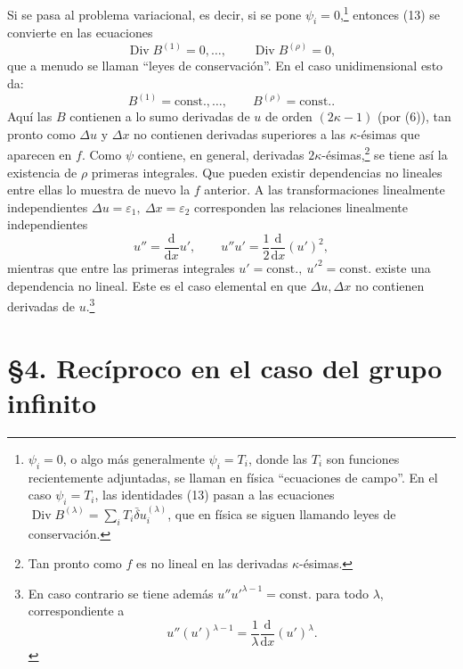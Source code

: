 \documentclass[11pt]{article}
\newcommand{\D}{\Delta}
\newcommand{\eps}{\varepsilon}
\providecommand{\dd}{\mathrm d}
\providecommand{\Div}{\operatorname{Div}}
\providecommand{\bd}{\bar{\delta}}
\begin{document}
Si se pasa al problema variacional, es decir, si se pone \(\psi_i=0\),\footnote{\(\psi_i=0\), o algo más generalmente \(\psi_i=T_i\), donde las \(T_i\) son funciones recientemente adjuntadas, se llaman en física ``ecuaciones de campo''. En el caso \(\psi_i=T_i\), las identidades (13) pasan a las ecuaciones \(\Div B^{(\lambda)}=\sum_i T_i\bd u_i^{(\lambda)}\), que en física se siguen llamando leyes de conservación.} entonces (13) se convierte en las ecuaciones
\[
\Div B^{(1)}=0,\ldots,\qquad \Div B^{(\rho)}=0,
\]
que a menudo se llaman ``leyes de conservación''. En el caso unidimensional esto da:
\[
B^{(1)}=\mathrm{const.},\ldots,\qquad B^{(\rho)}=\mathrm{const.}.
\]
Aquí las \(B\) contienen a lo sumo derivadas de \(u\) de orden \((2\kappa-1)\) (por (6)), tan pronto como \(\D u\) y \(\D x\) no contienen derivadas superiores a las \(\kappa\)-ésimas que aparecen en \(f\). Como \(\psi\) contiene, en general, derivadas \(2\kappa\)-ésimas,\footnote{Tan pronto como \(f\) es no lineal en las derivadas \(\kappa\)-ésimas.} se tiene así la existencia de \(\rho\) primeras integrales. Que pueden existir dependencias no lineales entre ellas lo muestra de nuevo la \(f\) anterior. A las transformaciones linealmente independientes \(\D u=\eps_1,\ \D x=\eps_2\) corresponden las relaciones linealmente independientes
\[
u''=\frac{\dd}{\dd x}u',\qquad
u''u'=\frac12\frac{\dd}{\dd x}(u')^2,
\]
mientras que entre las primeras integrales \(u'=\mathrm{const.},\ u'^2=\mathrm{const.}\) existe una dependencia no lineal. Este es el caso elemental en que \(\D u,\D x\) no contienen derivadas de \(u\).\footnote{En caso contrario se tiene además \(u''u'^{\lambda-1}=\mathrm{const.}\) para todo \(\lambda\), correspondiente a
\[
u''(u')^{\lambda-1}=\frac1\lambda\frac{\dd}{\dd x}(u')^\lambda.
\]}

\section*{\S{}4. Recíproco en el caso del grupo infinito}
\end{document}
